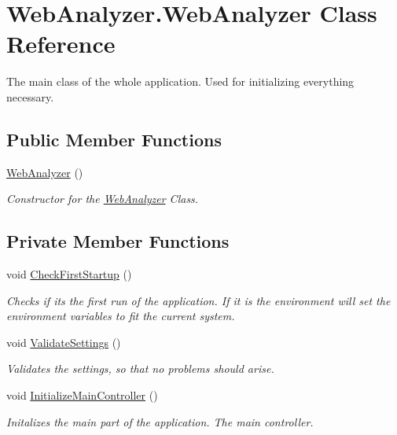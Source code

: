 \hypertarget{class_web_analyzer_1_1_web_analyzer}{}\section{Web\+Analyzer.\+Web\+Analyzer Class Reference}
\label{class_web_analyzer_1_1_web_analyzer}


The main class of the whole application. Used for initializing everything necessary.  


\subsection*{Public Member Functions}
\begin{DoxyCompactItemize}
\item 
\hyperlink{class_web_analyzer_1_1_web_analyzer_ac3c4730e70398623631f9d17daefc653}{Web\+Analyzer} ()
\begin{DoxyCompactList}\small\item\em Constructor for the \hyperlink{class_web_analyzer_1_1_web_analyzer}{Web\+Analyzer} Class. \end{DoxyCompactList}\end{DoxyCompactItemize}
\subsection*{Private Member Functions}
\begin{DoxyCompactItemize}
\item 
void \hyperlink{class_web_analyzer_1_1_web_analyzer_a1c5b48a17d7fd7247691600028e1642d}{Check\+First\+Startup} ()
\begin{DoxyCompactList}\small\item\em Checks if it\textquotesingle{}s the first run of the application. If it is the environment will set the environment variables to fit the current system. \end{DoxyCompactList}\item 
void \hyperlink{class_web_analyzer_1_1_web_analyzer_a18d28b1337ccc997b11909f029fe5dfb}{Validate\+Settings} ()
\begin{DoxyCompactList}\small\item\em Validates the settings, so that no problems should arise. \end{DoxyCompactList}\item 
void \hyperlink{class_web_analyzer_1_1_web_analyzer_a89f5a47ab6679dd95cce1c9dcdfd3772}{Initialize\+Main\+Controller} ()
\begin{DoxyCompactList}\small\item\em Initalizes the main part of the application. The main controller. \end{DoxyCompactList}\end{DoxyCompactItemize}
